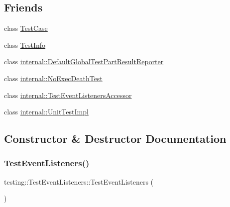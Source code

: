 \subsection*{Friends}
\begin{DoxyCompactItemize}
\item 
class \mbox{\hyperlink{classtesting_1_1_test_event_listeners_aff779e55b06adfa7c0088bd10253f0f0}{Test\+Case}}
\item 
class \mbox{\hyperlink{classtesting_1_1_test_event_listeners_a4c49c2cdb6c328e6b709b4542f23de3c}{Test\+Info}}
\item 
class \mbox{\hyperlink{classtesting_1_1_test_event_listeners_abae39633da9932847b41cb80efd62115}{internal\+::\+Default\+Global\+Test\+Part\+Result\+Reporter}}
\item 
class \mbox{\hyperlink{classtesting_1_1_test_event_listeners_afddba49fdf3f493532b4d5efb9814f4e}{internal\+::\+No\+Exec\+Death\+Test}}
\item 
class \mbox{\hyperlink{classtesting_1_1_test_event_listeners_addbc107b6b445617c880182bd4f44cf9}{internal\+::\+Test\+Event\+Listeners\+Accessor}}
\item 
class \mbox{\hyperlink{classtesting_1_1_test_event_listeners_acc0a5e7573fd6ae7ad1878613bb86853}{internal\+::\+Unit\+Test\+Impl}}
\end{DoxyCompactItemize}


\subsection{Constructor \& Destructor Documentation}
\mbox{\label{classtesting_1_1_test_event_listeners_af0716e4067a6f357ee5ea18802a591dd}} 
\subsubsection{\texorpdfstring{TestEventListeners()}{TestEventListeners()}}
{\footnotesize\ttfamily testing\+::\+Test\+Event\+Listeners\+::\+Test\+Event\+Listeners (\begin{DoxyParamCaption}{ }\end{DoxyParamCaption})}

\mbox{\label{classtesting_1_1_test_event_listeners_abe9fbbbedf7f55fa898abfae60aa4913}} 
